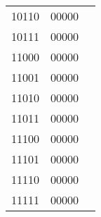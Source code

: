 \documentclass[paper=a4, fontsize=11pt]{scrartcl} %
\begin{document}
\begin{table}[H]
\begin{center}
\begin{tabular}{ccc}
        10110 & 00000 & \\
        10111 & 00000 & \\
        11000 & 00000 & \\
        11001 & 00000 & \\
        11010 & 00000 & \\
        11011 & 00000 & \\
        11100 & 00000 & \\
        11101 & 00000 & \\
        11110 & 00000 & \\
        11111 & 00000 & \\
        \bottomrule
        \end{tabular}
    \end{center}
\end{table}

\end{document}
